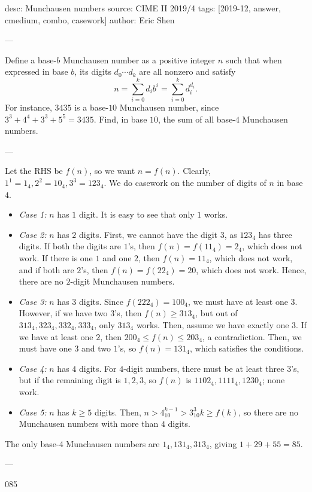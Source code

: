 desc: Munchausen numbers
source: CIME II 2019/4
tags: [2019-12, answer, cmedium, combo, casework]
author: Eric Shen

---

Define a base-$b$ Munchausen number as a positive integer $n$ such that when expressed in base $b$, its digits $d_0\cdots d_k$ are all nonzero and satisfy \[n=\sum_{i=0}^k d_ib^i=\sum_{i=0}^k d_i^{d_i}.\]
For instance, $3435$ is a base-$10$ Munchausen number, since $3^3+4^4+3^3+5^5=3435$. Find, in base $10$, the sum of all base-$4$ Munchausen numbers.

---

Let the RHS be $f(n)$, so we want $n=f(n)$. Clearly, $1^1=1_4,2^2=10_4,3^3=123_4$. We do casework on the number of digits of $n$ in base $4$.

\begin{itemize}
    \item \textit{Case 1:} $n$ has $1$ digit. It is easy to see that only $1$ works.

    \item \textit{Case 2:} $n$ has $2$ digits. First, we cannot have the digit $3$, as $123_4$ has three digits. If both the digits are $1$'s, then $f(n)=f(11_4)=2_4$, which does not work. If there is one $1$ and one $2$, then $f(n)=11_4$, which does not work, and if both are $2$'s, then $f(n)=f(22_4)=20$, which does not work. Hence, there are no $2$-digit Munchausen numbers.

    \item \textit{Case 3:} $n$ has $3$ digits. Since $f(222_4)=100_4$, we must have at least one $3$. However, if we have two $3$'s, then $f(n)\ge 313_4$, but out of $313_4,323_4,332_4,333_4$, only $313_4$ works. Then, assume we have exactly one $3$. If we have at least one $2$, then $200_4\le f(n)\le 203_4$, a contradiction. Then, we must have one $3$ and two $1$'s, so $f(n)=131_4$, which satisfies the conditions.

    \item \textit{Case 4:} $n$ has $4$ digits. For $4$-digit numbers, there must be at least three $3$'s, but if the remaining digit is $1,2,3$, so $f(n)$ is $1102_4,1111_4,1230_4$; none work.

    \item \textit{Case 5:} $n$ has $k\ge 5$ digits. Then, $n>4_{10}^{k-1}>3_{10}^3 k\ge f(k)$, so there are no Munchausen numbers with more than $4$ digits.
\end{itemize}

The only base-4 Munchausen numbers are $1_4,131_4,313_4$, giving $1+29+55=85$.

---

085
